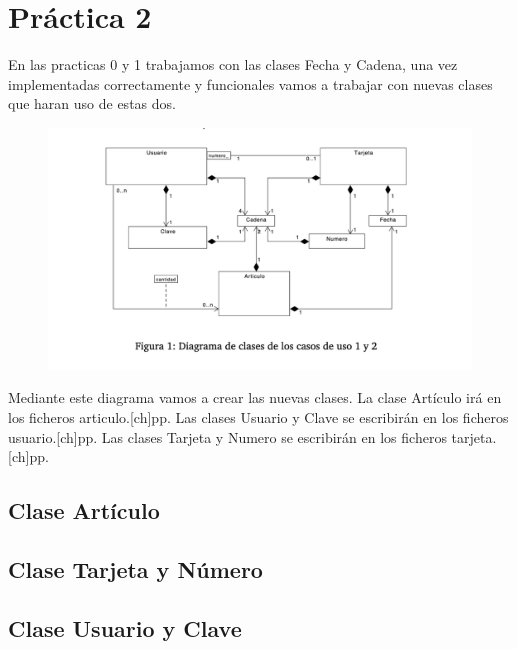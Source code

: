 \chapter{Práctica 2}
En las practicas 0 y 1 trabajamos con las clases Fecha y Cadena, una vez implementadas correctamente
y funcionales vamos a trabajar con nuevas clases que haran uso de estas dos.

\begin{figure}[h]
    \begin{center}
        \includegraphics[width=\textwidth]{Pics/P2_1.png}
    \end{center}
\end{figure}
Mediante este diagrama vamos a crear las nuevas clases.
La clase Artículo irá en los ficheros articulo.[ch]pp. Las clases Usuario y Clave se 
escribirán en los ficheros usuario.[ch]pp. Las clases Tarjeta y Numero se escribirán en los 
ficheros tarjeta.[ch]pp.

\section{Clase Artículo}
    
\section{Clase Tarjeta y Número}
    
\newpage
\section{Clase Usuario y Clave}
    



